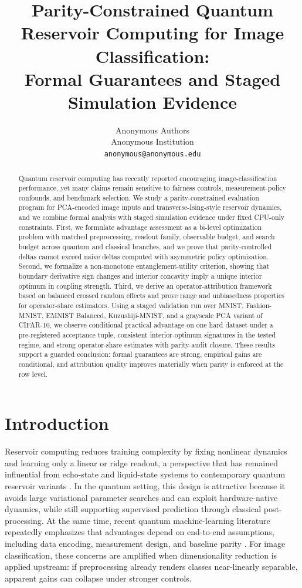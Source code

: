 \documentclass{article} %
\title{Parity-Constrained Quantum Reservoir Computing for Image Classification: \\ Formal Guarantees and Staged Simulation Evidence}
\author{Anonymous Authors \\
Anonymous Institution \\
\texttt{anonymous@anonymous.edu}}
\begin{document}
\maketitle

\begin{abstract}
Quantum reservoir computing has recently reported encouraging image-classification performance, yet many claims remain sensitive to fairness controls, measurement-policy confounds, and benchmark selection. We study a parity-constrained evaluation program for PCA-encoded image inputs and transverse-Ising-style reservoir dynamics, and we combine formal analysis with staged simulation evidence under fixed CPU-only constraints. First, we formulate advantage assessment as a bi-level optimization problem with matched preprocessing, readout family, observable budget, and search budget across quantum and classical branches, and we prove that parity-controlled deltas cannot exceed naive deltas computed with asymmetric policy optimization. Second, we formalize a non-monotone entanglement-utility criterion, showing that boundary derivative sign changes and interior concavity imply a unique interior optimum in coupling strength. Third, we derive an operator-attribution framework based on balanced crossed random effects and prove range and unbiasedness properties for operator-share estimators. Using a staged validation run over MNIST, Fashion-MNIST, EMNIST Balanced, Kuzushiji-MNIST, and a grayscale PCA variant of CIFAR-10, we observe conditional practical advantage on one hard dataset under a pre-registered acceptance tuple, consistent interior-optimum signatures in the tested regime, and strong operator-share estimates with parity-audit closure. These results support a guarded conclusion: formal guarantees are strong, empirical gains are conditional, and attribution quality improves materially when parity is enforced at the row level.
\end{abstract}

\section{Introduction}
Reservoir computing reduces training complexity by fixing nonlinear dynamics and learning only a linear or ridge readout, a perspective that has remained influential from echo-state and liquid-state systems to contemporary quantum reservoir variants \citep{jaeger2001,maass2002,lukosevicius2009}. In the quantum setting, this design is attractive because it avoids large variational parameter searches and can exploit hardware-native dynamics, while still supporting supervised prediction through classical post-processing. At the same time, recent quantum machine-learning literature repeatedly emphasizes that advantages depend on end-to-end assumptions, including data encoding, measurement design, and baseline parity \citep{biamonte2017,havlicek2019,schuld2020encoding,schuld2021kernel}. For image classification, these concerns are amplified when dimensionality reduction is applied upstream: if preprocessing already renders classes near-linearly separable, apparent gains can collapse under stronger controls.
\end{document}
